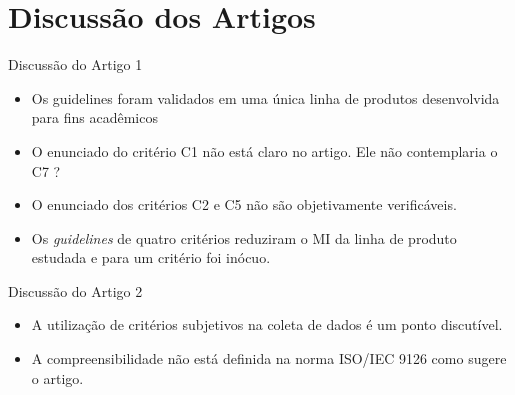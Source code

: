 \section{Discussão dos Artigos}
\begin{frame}[t, fragile]{Discussão do Artigo 1}
    \begin{itemize}
 
      \item Os guidelines foram \alert{validados} em uma \alert{única} linha de produtos desenvolvida para fins acadêmicos
      
       \item O enunciado do critério C1 \alert{não está claro} no artigo. Ele não contemplaria o C7 ?       
      \item O enunciado dos critérios C2 e C5 não são \alert{objetivamente} verificáveis. 
       
      \item Os \textit{guidelines} de \alert{quatro} critérios \alert{reduziram} o MI da linha de produto estudada e para \alert{um} critério
	foi \alert{inócuo}. 
      
     
    \end{itemize}
\end{frame}

\begin{frame}[t, fragile]{Discussão do Artigo 2}
    \begin{itemize}
     \item A utilização de critérios \alert{subjetivos} na coleta de dados é um ponto discutível.
     \item A compreensibilidade \alert{não está} definida na norma ISO/IEC 9126 como \alert{sugere} o artigo.
    \end{itemize}
\end{frame}

